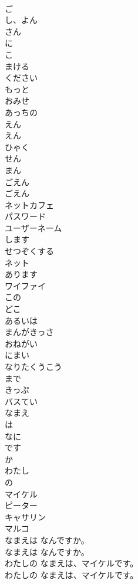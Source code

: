 \documentclass[8pt]{extreport}
\begin{document}
\begin{CJK}{UTF8}{min}
\\	ご
\\	し、よん
\\	さん
\\	に
\\	こ
\\	まける
\\	ください
\\	もっと
\\	おみせ
\\	あっちの
\\	えん
\\	えん
\\	ひゃく
\\	せん
\\	まん
\\	ごえん
\\	ごえん
\\	ネットカフェ
\\	パスワード
\\	ユーザーネーム
\\	します
\\	せつぞくする
\\	ネット
\\	あります
\\	ワイファイ
\\	この
\\	どこ
\\	あるいは
\\	まんがきっさ
\\	おねがい
\\	にまい
\\	なりたくうこう
\\	まで
\\	きっぷ
\\	バスてい
\\	なまえ
\\	は
\\	なに
\\	です
\\	か
\\	わたし
\\	の
\\	マイケル
\\	ピーター
\\	キャサリン
\\	マルコ
\\	なまえは なんですか。	
\\	なまえは なんですか。 
\\	わたしの なまえは、マイケルです。	
\\	わたしの なまえは、マイケルです。 

\end{CJK}
\end{document}
